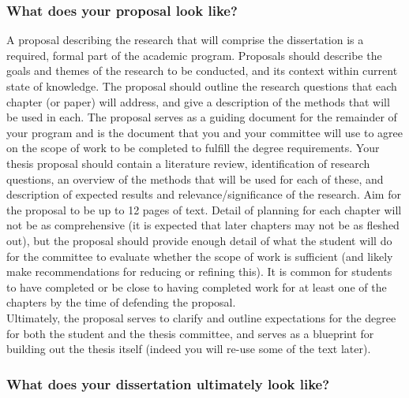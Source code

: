\documentclass[
  letterpaper,
  DIV=11,
  numbers=noendperiod]{scrreprt}
\begin{document}
\hypertarget{what-does-your-proposal-look-like}{%
\subsubsection{\texorpdfstring{What does your \textbf{proposal} look
like?}{What does your proposal look like?}}\label{what-does-your-proposal-look-like}}

A proposal describing the research that will comprise the dissertation
is a required, formal part of the academic program. Proposals should
describe the goals and themes of the research to be conducted, and its
context within current state of knowledge. The proposal should outline
the research questions that each chapter (or paper) will address, and
give a description of the methods that will be used in each. The
proposal serves as a guiding document for the remainder of your program
and is the document that you and your committee will use to agree on the
scope of work to be completed to fulfill the degree requirements. Your
thesis proposal should contain a literature review, identification of
research questions, an overview of the methods that will be used for
each of these, and description of expected results and
relevance/significance of the research. Aim for the proposal to be up to
12 pages of text. Detail of planning for each chapter will not be as
comprehensive (it is expected that later chapters may not be as fleshed
out), but the proposal should provide enough detail of what the student
will do for the committee to evaluate whether the scope of work is
sufficient (and likely make recommendations for reducing or refining
this). It is common for students to have completed or be close to having
completed work for at least one of the chapters by the time of defending
the proposal.\\
Ultimately, the proposal serves to clarify and outline expectations for
the degree for both the student and the thesis committee, and serves as
a blueprint for building out the thesis itself (indeed you will re-use
some of the text later).

\hypertarget{what-does-your-dissertation-ultimately-look-like}{%
\subsubsection{\texorpdfstring{What does your \textbf{dissertation}
ultimately look
like?}{What does your dissertation ultimately look like?}}\label{what-does-your-dissertation-ultimately-look-like}}
\end{document}
